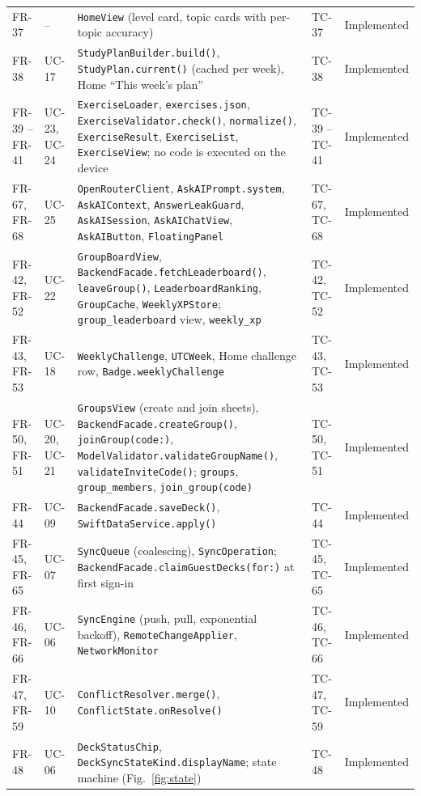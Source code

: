 \documentclass[12pt,letterpaper]{article}
\begin{document}
\begin{xltabular}{\textwidth}{@{}l L{1.6cm} Y L{2.0cm} L{1.9cm}@{}}
FR-37 & -- & \texttt{HomeView} (level card, topic cards with per-topic accuracy) & TC-37 & Implemented \\
FR-38 & UC-17 & \texttt{StudyPlanBuilder.build()}, \texttt{StudyPlan.current()} (cached per week), Home ``This week's plan'' & TC-38 & Implemented \\
FR-39 -- FR-41 & UC-23, UC-24 & \texttt{ExerciseLoader}, \texttt{exercises.json}, \texttt{ExerciseValidator.check()}, \texttt{normalize()}, \texttt{ExerciseResult}, \texttt{ExerciseList}, \texttt{ExerciseView}; no code is executed on the device & TC-39 -- TC-41 & Implemented \\
FR-67, FR-68 & UC-25 & \texttt{OpenRouterClient}, \texttt{AskAIPrompt.system}, \texttt{AskAIContext}, \texttt{AnswerLeakGuard}, \texttt{AskAISession}, \texttt{AskAIChatView}, \texttt{AskAIButton}, \texttt{FloatingPanel} & TC-67, TC-68 & Implemented \\
FR-42, FR-52 & UC-22 & \texttt{GroupBoardView}, \texttt{BackendFacade.fetchLeaderboard()}, \texttt{leaveGroup()}, \texttt{LeaderboardRanking}, \texttt{GroupCache}, \texttt{WeeklyXPStore}; \texttt{group\_leaderboard} view, \texttt{weekly\_xp} & TC-42, TC-52 & Implemented \\
FR-43, FR-53 & UC-18 & \texttt{WeeklyChallenge}, \texttt{UTCWeek}, Home challenge row, \texttt{Badge.weeklyChallenge} & TC-43, TC-53 & Implemented \\
FR-50, FR-51 & UC-20, UC-21 & \texttt{GroupsView} (create and join sheets), \texttt{BackendFacade.createGroup()}, \texttt{joinGroup(code:)}, \texttt{ModelValidator.validateGroupName()}, \texttt{validateInviteCode()}; \texttt{groups}, \texttt{group\_members}, \texttt{join\_group(code)} & TC-50, TC-51 & Implemented \\
FR-44 & UC-09 & \texttt{BackendFacade.saveDeck()}, \texttt{SwiftDataService.apply()} & TC-44 & Implemented \\
FR-45, FR-65 & UC-07 & \texttt{SyncQueue} (coalescing), \texttt{SyncOperation}; \texttt{BackendFacade.\allowbreak claimGuestDecks(for:)} at first sign-in & TC-45, TC-65 & Implemented \\
FR-46, FR-66 & UC-06 & \texttt{SyncEngine} (push, pull, exponential backoff), \texttt{RemoteChangeApplier}, \texttt{NetworkMonitor} & TC-46, TC-66 & Implemented \\
FR-47, FR-59 & UC-10 & \texttt{ConflictResolver.merge()}, \texttt{ConflictState.onResolve()} & TC-47, TC-59 & Implemented \\
FR-48 & UC-06 & \texttt{DeckStatusChip}, \texttt{DeckSyncStateKind.displayName}; state machine (Fig.~\ref{fig:state}) & TC-48 & Implemented \\

\end{xltabular}
\end{document}
